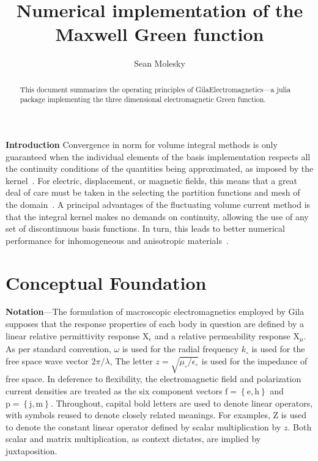 \documentclass[reprint,aps,prb]{revtex4-2}
\newcommand{\bmm}[1]{\bm{\mathrm{#1}}}
\begin{document}
\title{Numerical implementation of the Maxwell Green function}
\author{Sean Molesky}
\begin{abstract}
\noindent
This document summarizes the operating principles of GilaElectromagnetics---a julia package implementing the three dimensional electromagnetic Green function.
\end{abstract}
\maketitle
\noindent
\textbf{Introduction}
Convergence in norm for volume integral methods is only guaranteed when the individual elements of the basis implementation respects all the continuity conditions of the quantities being approximated, as imposed by the kernel~\cite{van2008well}. 
For electric, displacement, or magnetic fields, this means that a great deal of care must be taken in the selecting the partition functions and mesh of the domain~\cite{van2007gaps}. 
A principal advantages of the fluctuating volume current method is that the integral kernel makes no demands on continuity, allowing the use of any set of discontinuous basis functions. 
In turn, this leads to better numerical performance for inhomogeneous and anisotropic materials~\cite{markkanen2012discretization}. 
\section{Conceptual Foundation}
\noindent
\textbf{Notation}---The formulation of macroscopic electromagnetics employed by Gila supposes that the response properties of each body in question are defined by a linear relative permittivity response $\bmm{X}_{\epsilon}$ and a relative permeability response $\bmm{X}_{\mu}$. 
As per standard convention, $\omega$ is used for the radial frequency  $k_{\circ}$ is used for the free space wave vector $2\pi/\lambda$, 
The letter $z = \sqrt{\mu_{\circ}/\epsilon_{\circ}}$ is used for the impedance of free space. 
In deference to flexibility, the electromagnetic field and polarization current densities are treated as the six component vectors $\bmm{f}=\left\{\bmm{e},\bmm{h}\right\}$ and $\bmm{p} = \left\{\bmm{j},\bmm{m}\right\}$.  
Throughout, capital bold letters are used to denote linear operators, with symbols reused to denote closely related meanings. 
For examples, $\bmm{Z}$ is used to denote the constant linear operator defined by scalar multiplication by $z$. 
Both scalar and matrix multiplication, as context dictates, are implied by juxtaposition. 
\end{document}
